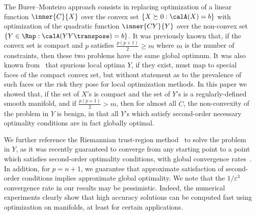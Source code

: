 \documentclass{article}
\newcommand{\1}{\mathbf{1}}
\begin{document}
The Burer--Monteiro approach consists in replacing optimization of a linear function $\inner{C}{X}$ over the convex set $\{X\succeq 0 : \calA(X) = b\}$ with optimization of the quadratic function $\inner{CY}{Y}$ over the non-convex set $\{Y\in\Rnp : \calA(YY\transpose) = b\}$. It was previously known that, if the convex set is compact and $p$ satisfies $\frac{p(p+1)}{2} \geq m$ where $m$ is the number of constraints, then these two problems have the same global optimum. It was also known from~\citep{burer2005local} that spurious local optima $Y$, if they exist, must map to special faces of the compact convex set, but without statement as to the prevalence of such faces or the risk they pose for local optimization methods. In this paper we showed that, if the set of $X$'s is compact and the set of $Y$'s is a regularly-defined smooth manifold, and if $\frac{p(p+1)}{2} > m$, then for almost all $C$, the non-convexity of the problem in $Y$ is benign, in that all $Y$'s which satisfy second-order necessary optimality conditions are in fact globally optimal. %
%
%

We further reference the Riemannian trust-region method~\citep{genrtr} to solve the problem in $Y$, as it was recently guaranteed to converge from any starting point to a point which satisfies second-order optimality conditions, with global convergence rates~\citep{boumal2016globalrates}. 
In addition, for $p=n+1$, we guarantee that approximate satisfaction of second-order conditions implies approximate global optimality. We note that the $1/\varepsilon^3$ convergence rate in our results may be pessimistic. 
Indeed, the numerical experiments clearly show that high accuracy solutions can be computed fast using optimization on manifolds, at least for certain applications.
\end{document}
